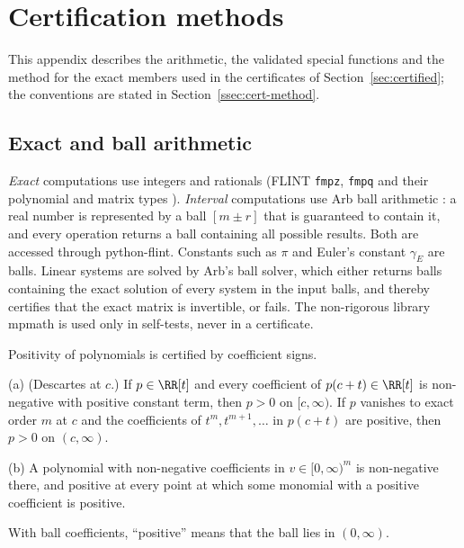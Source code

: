 \section{Certification methods}\label{app:certification}

This appendix describes the arithmetic, the validated special functions and the method for the exact members used in the certificates
of Section~\ref{sec:certified}; the conventions are stated in Section~\ref{ssec:cert-method}.

\subsection{Exact and ball arithmetic}

\begin{remark}
\emph{Exact} computations use integers and rationals (FLINT \texttt{fmpz}, \texttt{fmpq} and their polynomial and matrix
types \cite{FLINT}). \emph{Interval} computations use Arb ball arithmetic \cite{Joh17}: a real number is represented by a
ball $[m\pm r]$ that is guaranteed to contain it, and every operation returns a ball containing all possible results.
Both are accessed through python-flint. Constants such as $\pi$ and Euler's constant $\gamma_E$ are balls. Linear systems are solved by Arb's
ball solver, which either returns balls containing the exact solution of every system in the input balls, and thereby certifies that
the exact matrix is invertible, or fails. The non-rigorous library mpmath \cite{mpmath} is used only in self-tests, never in a
certificate.
\end{remark}

Positivity of polynomials is certified by coefficient signs.

\begin{lemma}\label{lem:posc}
\textup{(a)} \textup{(Descartes at $c$.)} If $p\in\RR[t]$ and every coefficient of $p(c+t)\in\RR[t]$ is non-negative with
positive constant term, then $p>0$ on $[c,\infty)$. If $p$ vanishes to exact order $m$ at $c$ and the coefficients of
$t^m,t^{m+1},\dots$ in $p(c+t)$ are positive, then $p>0$ on $(c,\infty)$.

\textup{(b)} A polynomial with non-negative coefficients in $v\in[0,\infty)^m$ is non-negative there, and positive at every
point at which some monomial with a positive coefficient is positive.

With ball coefficients, ``positive'' means that the ball lies in $(0,\infty)$.
\end{lemma}

